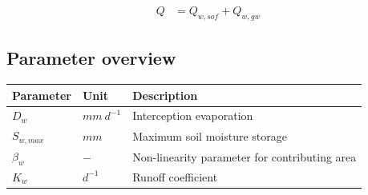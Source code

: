 \begin{align}
	Q &= Q_{w,sof}+Q_{w,gw}
\end{align}

\newpage
\subsection{Parameter overview}
\begin{table}[htbp]
  \centering
    \begin{tabular}{lll}
    \toprule
    Parameter & Unit  & Description \\
    \midrule
    $D_w$ & $mm~d^{-1}$ & Interception evaporation  \\
    $S_{w,max}$ & $mm$  & Maximum soil moisture storage \\
    $\beta_w$ & $-$   & Non-linearity parameter for contributing area \\
    $K_w$ & $d^{-1}$ & Runoff coefficient \\
    \bottomrule
    \end{tabular}%
  \label{tab:addlabel}%
\end{table}%
